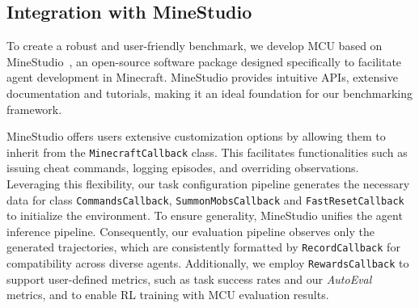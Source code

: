 \subsection{Integration with MineStudio}
\label{sec:minestudio}
To create a robust and user-friendly benchmark, we develop MCU based on MineStudio~\citep{minestudio}, an open-source software package designed specifically to facilitate agent development in Minecraft. MineStudio provides intuitive APIs, extensive documentation and tutorials, making it an ideal foundation for our benchmarking framework.

MineStudio offers users extensive customization options by allowing them to inherit from the \texttt{MinecraftCallback} class. This facilitates functionalities such as issuing cheat commands, logging episodes, and overriding observations. Leveraging this flexibility, our task configuration pipeline generates the necessary data for class \texttt{CommandsCallback}, \texttt{SummonMobsCallback} and \texttt{FastResetCallback} to initialize the environment. To ensure generality, MineStudio unifies the agent inference pipeline. Consequently, our evaluation pipeline observes only the generated trajectories, which are consistently formatted by \texttt{RecordCallback} for compatibility across diverse agents. Additionally, we employ \texttt{RewardsCallback} to support user-defined metrics, such as task success rates and our \emph{AutoEval} metrics, and to enable RL training with MCU evaluation results.




